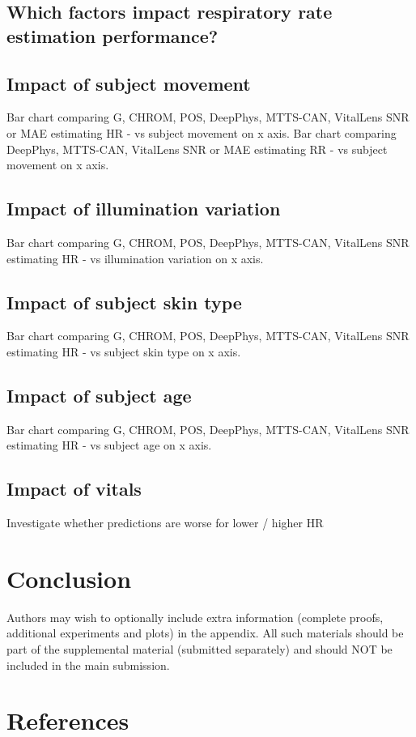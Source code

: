 \documentclass{article}
\begin{document}
\subsection{Which factors impact respiratory rate estimation performance?}



\subsection{Impact of subject movement}

Bar chart comparing G, CHROM, POS, DeepPhys, MTTS-CAN, VitalLens SNR or MAE estimating HR - vs subject movement on x axis.
Bar chart comparing DeepPhys, MTTS-CAN, VitalLens SNR or MAE estimating RR - vs subject movement on x axis.

\subsection{Impact of illumination variation}

Bar chart comparing G, CHROM, POS, DeepPhys, MTTS-CAN, VitalLens SNR estimating HR - vs illumination variation on x axis.

\subsection{Impact of subject skin type}

Bar chart comparing G, CHROM, POS, DeepPhys, MTTS-CAN, VitalLens SNR estimating HR - vs subject skin type on x axis.

\subsection{Impact of subject age}

Bar chart comparing G, CHROM, POS, DeepPhys, MTTS-CAN, VitalLens SNR estimating HR - vs subject age on x axis.

\subsection{Impact of vitals}

Investigate whether predictions are worse for lower / higher HR

\section{Conclusion}
\label{sec:conclusion}

Authors may wish to optionally include extra information (complete proofs, additional experiments and plots) in the appendix. All such materials should be part of the supplemental material (submitted separately) and should NOT be included in the main submission.

\section*{References}




\end{document}
